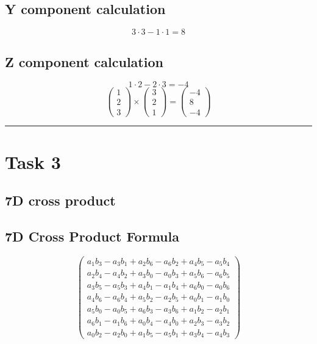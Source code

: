 \documentclass{article}
\begin{document}
\subsection*{ \vspace{1em} Y component calculation}
\[
3 \cdot 3 - 1 \cdot 1 = 8
\]
\subsection*{ \vspace{1em} Z component calculation}
\[
1 \cdot 2 - 2 \cdot 3 = -4
\]
\[
\begin{pmatrix}1 \\ 2 \\ 3\end{pmatrix} \times \begin{pmatrix}3 \\ 2 \\ 1\end{pmatrix} = \begin{pmatrix}-4 \\ 8 \\ -4\end{pmatrix}
\]
\vspace{1em}
\hrule
\vspace{1em}
\section*{Task 3}

\subsection*{7D cross product}
\subsection*{ \vspace{1em} 7D Cross Product Formula}
\[
\begin{pmatrix}
        a_1b_3 - a_3b_1 + a_2b_6 - a_6b_2 + a_4b_5 - a_5b_4 \\
        a_2b_4 - a_4b_2 + a_3b_0 - a_0b_3 + a_5b_6 - a_6b_5 \\
        a_3b_5 - a_5b_3 + a_4b_1 - a_1b_4 + a_6b_0 - a_0b_6 \\
        a_4b_6 - a_6b_4 + a_5b_2 - a_2b_5 + a_0b_1 - a_1b_0 \\
        a_5b_0 - a_0b_5 + a_6b_3 - a_3b_6 + a_1b_2 - a_2b_1 \\
        a_6b_1 - a_1b_6 + a_0b_4 - a_4b_0 + a_2b_3 - a_3b_2 \\
        a_0b_2 - a_2b_0 + a_1b_5 - a_5b_1 + a_3b_4 - a_4b_3
        \end{pmatrix}
\]
\end{document}
